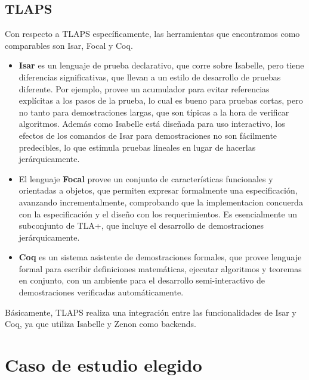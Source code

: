 \documentclass[spanish]{llncs}
\begin{document}
  \subsection{TLAPS}
  Con respecto a TLAPS específicamente, las herramientas que encontramos como comparables son Isar, Focal y Coq.
    \begin{itemize}
      \item 
      \textbf{Isar} es un lenguaje de prueba declarativo, que corre sobre Isabelle, pero tiene diferencias significativas, que llevan a un estilo de desarrollo de pruebas diferente. Por ejemplo, provee un acumulador para evitar referencias explícitas a los pasos de la prueba, lo cual es bueno para pruebas cortas, pero no tanto para demostraciones largas, que son típicas a la hora de verificar algoritmos. Además como Isabelle está diseñada para uso interactivo, los efectos de los comandos de Isar para demostraciones no son fácilmente 
      predecibles, lo que estimula pruebas lineales en lugar de hacerlas jerárquicamente. 

      \item
      El lenguaje \textbf{Focal} provee un conjunto de características funcionales y orientadas a objetos, que permiten expresar formalmente una especificación, avanzando incrementalmente, comprobando que la implementacion concuerda con la especificación y el diseño con los requerimientos. Es esencialmente un subconjunto de TLA+, que incluye el desarrollo 
      de demostraciones jerárquicamente.

      \item
      \textbf{Coq} es un sistema asistente de demostraciones formales, que provee lenguaje formal para escribir definiciones matemáticas, ejecutar algoritmos y teoremas en conjunto, con un ambiente para el desarrollo semi-interactivo de demostraciones verificadas automáticamente.

    \end{itemize}
  
  Básicamente, TLAPS realiza una integración entre las funcionalidades de  Isar y Coq, ya que utiliza Isabelle y Zenon como backends.

\section{Caso de estudio elegido}

\end{document}
